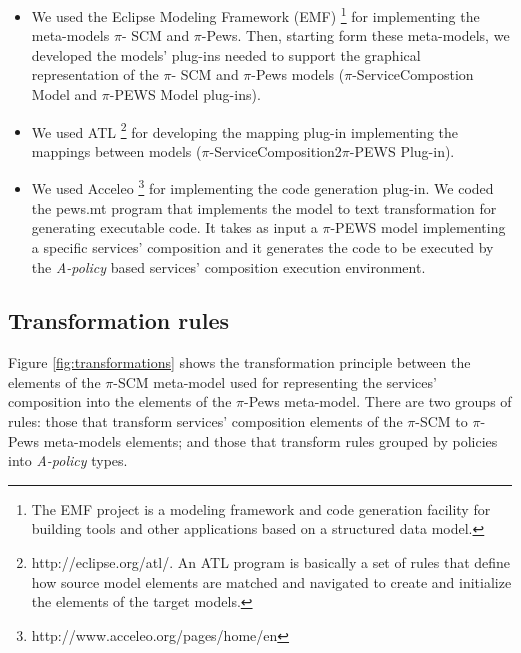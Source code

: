 \begin{itemize}
\item 	We  used the Eclipse Modeling Framework (EMF) \footnote {The EMF project is a modeling framework and code generation facility for building tools and other applications based on a structured data model.}   for implementing the meta-models  $\pi$- SCM and $\pi$-{\sc Pews}. Then, starting form these meta-models, we  developed the models' plug-ins needed to support the graphical representation of the $\pi$- SCM and $\pi$-{\sc Pews} models ($\pi$-ServiceCompostion Model and $\pi$-PEWS Model plug-ins).

\item	 We used  ATL \footnote{http://eclipse.org/atl/. An ATL program is basically a set of rules that define how source model elements are matched and navigated to create and initialize the elements of the target models.}
for  developing the mapping plug-in implementing the  mappings between models ($\pi$-ServiceComposition2$\pi$-PEWS Plug-in).

\item 	We  used Acceleo \footnote{http://www.acceleo.org/pages/home/en} for implementing  the code generation plug-in. We coded the pews.mt program  that implements the model to text transformation for generating executable code. It takes as input a $\pi$-PEWS model implementing a specific services' composition and it generates the code to be executed by the 
{\em A-policy} based services' composition execution environment. 

\end{itemize}

\subsection{Transformation rules}\label{sec:mmrules}

Figure \ref{fig:transformations} shows the transformation principle between the elements of the $\pi$-SCM meta-model used for representing the services' composition into the elements of the $\pi$-{\sc Pews} meta-model. There are two groups of rules: those that transform services' composition elements of the $\pi$-SCM to $\pi$-{\sc Pews} meta-models elements; and those that transform rules grouped by policies into {\em A-policy} types.

